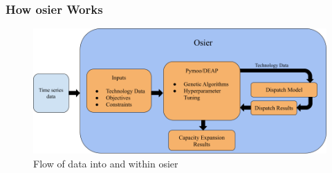 \begin{frame}
    \frametitle{How \gls{osier} Works}

    \begin{figure}
        \centering
        \includegraphics[width=\columnwidth]{../docs/figures/03_osier_chapter/osier_flow.png}
        \caption{Flow of data into and within \gls{osier}}
        \label{fig:osier-flow-1}
    \end{figure}

\end{frame}

